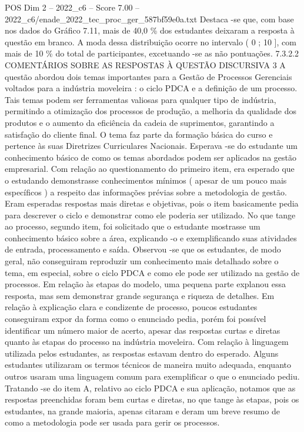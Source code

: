 \begin{textsample}{POS Dim 2 – 2022\_c6 – Score 7.00 – 2022\_c6/enade\_2022\_tec\_proc\_ger\_587bf59e0a.txt}
Destaca -se que, com base nos dados do Gráfico 7.11, mais de 40,0 \% dos estudantes deixaram a resposta à questão em branco.
A moda dessa distribuição ocorre no intervalo ( 0 ; 10 ], com mais de 10 \% do total de participantes, excetuando -se as não pontuações. 7.3.2.2 COMENTÁRIOS SOBRE AS RESPOSTAS À QUESTÃO DISCURSIVA 3 A questão abordou dois temas importantes para a Gestão de Processos Gerenciais voltados para a indústria moveleira : o ciclo PDCA e a definição de um processo.
Tais temas podem ser ferramentas valiosas para qualquer tipo de indústria, permitindo a otimização dos processos de produção, a melhoria da qualidade dos produtos e o aumento da eficiência da cadeia de suprimentos, garantindo a satisfação do cliente final.
O tema faz parte da formação básica do curso e pertence às suas Diretrizes Curriculares Nacionais.
Esperava -se do estudante um conhecimento básico de como os temas abordados podem ser aplicados na gestão empresarial.
Com relação ao questionamento do primeiro item, era esperado que o estudando demonstrasse conhecimentos mínimos ( apesar de um pouco mais específicos ) a respeito das informações prévias sobre a metodologia de gestão.
Eram esperadas respostas mais diretas e objetivas, pois o item basicamente pedia para descrever o ciclo e demonstrar como ele poderia ser utilizado.
No que tange ao processo, segundo item, foi solicitado que o estudante mostrasse um conhecimento básico sobre a área, explicando -o e exemplificando suas atividades de entrada, processamento e saída.
Observou -se que os estudantes, de modo geral, não conseguiram reproduzir um conhecimento mais detalhado sobre o tema, em especial, sobre o ciclo PDCA e como ele pode ser utilizado na gestão de processos.
Em relação às etapas do modelo, uma pequena parte explanou essa resposta, mas sem demonstrar grande segurança e riqueza de detalhes.
Em relação à explicação clara e condizente de processo, poucos estudantes conseguiram expor da forma como o enunciado pedia, porém foi possível identificar um número maior de acerto, apesar das respostas curtas e diretas quanto às etapas do processo na indústria moveleira.
Com relação à linguagem utilizada pelos estudantes, as respostas estavam dentro do esperado.
Alguns estudantes utilizaram os termos técnicos de maneira muito adequada, enquanto outros usaram uma linguagem comum para exemplificar o que o enunciado pediu.
Tratando -se do item A, relativo ao ciclo PDCA e sua aplicação, notamos que as respostas preenchidas foram bem curtas e diretas, no que tange às etapas, pois os estudantes, na grande maioria, apenas citaram e deram um breve resumo de como a metodologia pode ser usada para gerir os processos.

\end{textsample}
